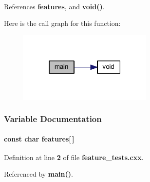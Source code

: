 References {\bf features}, and {\bf void()}.



Here is the call graph for this function\+:
\nopagebreak
\begin{figure}[H]
\begin{center}
\leavevmode
\includegraphics[width=189pt]{d7/d8d/soapysdr_2build_2CMakeFiles_2feature__tests_8cxx_a3c04138a5bfe5d72780bb7e82a18e627_cgraph}
\end{center}
\end{figure}




\subsubsection{Variable Documentation}
\paragraph[{features}]{\setlength{\rightskip}{0pt plus 5cm}const char features[$\,$]}\label{soapysdr_2build_2CMakeFiles_2feature__tests_8cxx_a1582568e32f689337602a16bf8a5bff0}


Definition at line {\bf 2} of file {\bf feature\+\_\+tests.\+cxx}.



Referenced by {\bf main()}.

